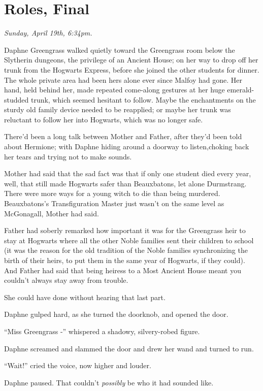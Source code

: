 \chapter{Roles, Final}

\emph{Sunday, April 19th, 6:34pm.}

Daphne Greengrass walked quietly toward the Greengrass room below the Slytherin dungeons, the privilege of an Ancient House; on her way to drop off her trunk from the Hogwarts Express, before she joined the other students for dinner. The whole private area had been hers alone ever since Malfoy had gone. Her hand, held behind her, made repeated come-along gestures at her huge emerald-studded trunk, which seemed hesitant to follow. Maybe the enchantments on the sturdy old family device needed to be reapplied; or maybe her trunk was reluctant to follow her into Hogwarts, which was no longer safe.

There'd been a long talk between Mother and Father, after they'd been told about Hermione; with Daphne hiding around a doorway to listen,choking back her tears and trying not to make sounds.

Mother had said that the sad fact was that if only one student died every year, well, that still made Hogwarts safer than Beauxbatons, let alone Durmstrang. There were more ways for a young witch to die than being murdered. Beauxbatons's Transfiguration Master just wasn't on the same level as McGonagall, Mother had said.

Father had soberly remarked how important it was for the Greengrass heir to stay at Hogwarts where all the other Noble families sent their children to school (it was the reason for the old tradition of the Noble families synchronizing the birth of their heirs, to put them in the same year of Hogwarts, if they could). And Father had said that being heiress to a Most Ancient House meant you couldn't always stay away from trouble.

She could have done without hearing that last part.

Daphne gulped hard, as she turned the doorknob, and opened the door.

``Miss Greengrass -'' whispered a shadowy, silvery-robed figure.

Daphne screamed and slammed the door and drew her wand and turned to run.

``Wait!'' cried the voice, now higher and louder.

Daphne paused. That couldn't \emph{possibly} be who it had sounded like.

